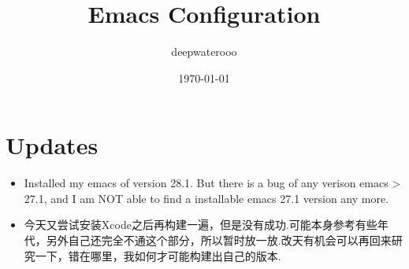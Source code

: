 \documentclass[9pt, b5paper]{article}
\author{deepwaterooo}
\date{\today}
\title{Emacs Configuration}
\begin{document}
\maketitle
\tableofcontents


\section{Updates}
\label{sec-1}
\begin{itemize}
\item Installed my emacs of version 28.1. But there is a bug of any verison emacs > 27.1, and I am NOT able to find a installable emacs 27.1 version any more.
\item 今天又尝试安装Xcode之后再构建一遍，但是没有成功.可能本身参考有些年代，另外自己还完全不通这个部分，所以暂时放一放.改天有机会可以再回来研究一下，错在哪里，我如何才可能构建出自己的版本.
\end{itemize}
\end{document}
